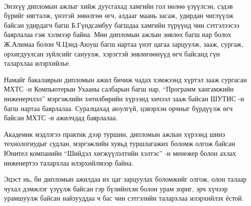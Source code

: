 
\begin{acknowledgements}
\addchaptertocentry{\acknowledgementname}

\paragraph{} Энэхүү дипломын ажлыг хийж дуусгахад хамгийн гол нөлөө үзүүлсэн, сэдэв бүрийг нягталж,  үнэтэй зөвөлгөө өгч,  алдааг маань засаж, удирдан чиглүүлж байсан удирдагч багш Б.Гүндсамбуу багшдаа хамгийн түрүүнд чин сэтгэлээсээ баярлалаа гэж хэлмээр байна. Мөн дипломын ажлын зөвлөх багш нар болох Ж.Алимаа болон Ч.Цэнд-Аюуш багш нартаа үнэт цагаа зарцуулж, зааж, сургаж, орхигдуулсан зүйлсийг сануулж, хэрэгтэй зөвлөгөөнүүд өгч байсанд гүн талархлаа илэрхийлье.
\newline
\newline
\par Намайг бакалаврын дипломын ажил бичиж чадах хэмжээнд хүртэл зааж сургасан МХТС -н Компьютерын Ухааны салбарын багш нар, “Программ хангамжийн инженерчлэл” мэргэжлийн хөтөлбөрийн хүрээнд хичээл зааж байсан ШУТИС -н багш нартаа баярлалаа. Суралцахад аюулгүй, цэвэрхэн орчныг бүрдүүлж өгч байсан МХТС -н ажилчдад баярлалаа.
\newline
\newline
\par Академик мэдлэгээ практик дээр туршин, дипломын ажлын хүрээнд шинэ технологиудыг судлан, мэргэжлийн хувьд туршлагажих боломж олгож байсан Юнител компанийн “Шийдэл хөгжүүлэлтийн хэлтэс” -н менежер болон ахлах инженертээ талархлаа илэрхийлмээр байна.
\newline
\newline
\par Эцэст нь, би дипломын ажилдаа их цаг зарцуулах боломжийг олгож, олон талаар чухал дэмжлэг үзүүлж байсан гэр бүлийнхэн болон урам зориг, эрч хүчээр урамшуулж байсан найзууддаа ч бас чин сэтгэлийн талархлаа илэрхийлэх ёстой.


\end{acknowledgements}